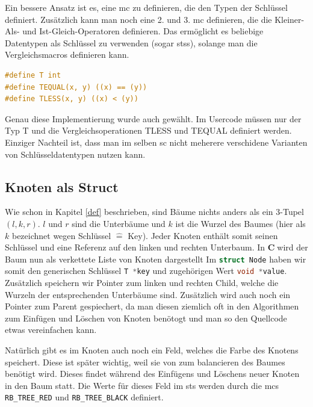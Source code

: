 \documentclass[11pt]{article}
\newcommand{\lstin}[1]{\lstinline[language=C]{#1}}
\newcommand{\cpl}{\textbf{C}$\;$}
\begin{document}
Ein bessere Ansatz ist es, eine \gls{mc} zu definieren, die den Typen der Schlüssel definiert. Zusätzlich kann man noch eine 2. und 3. \gls{mc} definieren, die die Kleiner-Als- und Ist-Gleich-Operatoren definieren.
Das ermöglicht es beliebige Datentypen als Schlüssel zu verwenden (sogar \glspl{sts}), solange man die Vergleichsmacros definieren kann.

\begin{lstlisting}[language=C]
#define T int
#define TEQUAL(x, y) ((x) == (y))
#define TLESS(x, y) ((x) < (y))
\end{lstlisting}

Genau diese Implementierung wurde auch gewählt. Im Usercode müssen nur der Typ T und die Vergleichsoperationen TLESS und TEQUAL definiert werden. Einziger Nachteil ist, dass man im selben \gls{sc} nicht meherere verschidene Varianten von Schlüsseldatentypen nutzen kann.

\subsection{Knoten als Struct}
Wie schon in Kapitel \ref{def} beschrieben, sind Bäume nichts anders als ein 3-Tupel $(l, k, r)$.
$l$ und $r$ sind die Unterbäume und $k$ ist die Wurzel des Baumes (hier als $k$ bezeichnet wegen Schlüssel $\widehat{=}$ Key).
Jeder Knoten enthält somit seinen Schlüssel und eine Referenz auf den linken und rechten Unterbaum.
In \cpl wird der Baum nun als verkettete Liste von Knoten dargestellt
Im \lstin{struct Node} haben wir somit den generischen Schlüssel \lstin{T *key} und zugehörigen Wert \lstin{void *value}.
Zusätzlich speichern wir Pointer zum linken und rechten Child, welche die Wurzeln der entsprechenden Unterbäume sind. Zusätzlich wird auch noch ein Pointer zum Parent gespiechert,
da man diesen ziemlich oft in den Algorithmen zum Einfügen und Löschen von Knoten benötogt und man so den Quellcode etwas vereinfachen kann.

Natürlich gibt es im Knoten auch noch ein Feld, welches die Farbe des Knotens speichert. Diese ist später wichtig, weil sie von zum balancieren des Baumes benötigt wird.
Dieses findet während des Einfügens und Löschens neuer Knoten in den Baum statt. Die Werte für dieses Feld im \gls{sts} werden durch die \glspl{mc} \lstin{RB_TREE_RED} und \lstin{RB_TREE_BLACK} definiert.
\end{document}
